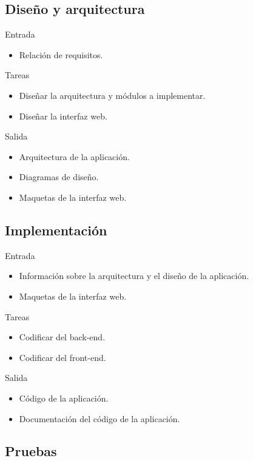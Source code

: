 \subsection*{Diseño y arquitectura\label{ssec:dp:disenho}}

Entrada
\begin{itemize}[leftmargin=3.5em]
  \item Relación de requisitos.
\end{itemize}

Tareas
\begin{itemize}[leftmargin=3.5em]
  \item Diseñar la arquitectura y módulos a implementar.
  \item Diseñar la interfaz web.
\end{itemize}

Salida
\begin{itemize}[leftmargin=3.5em]
  \item Arquitectura de la aplicación.
  \item Diagramas de diseño.
  \item Maquetas de la interfaz web.
\end{itemize}

\subsection*{Implementación\label{ssec:dp:implementacion}}

Entrada
\begin{itemize}[leftmargin=3.5em]
  \item Información sobre la arquitectura y el diseño de la aplicación.
  \item Maquetas de la interfaz web.
\end{itemize}

Tareas
\begin{itemize}[leftmargin=3.5em]
  \item Codificar del \gls{back-end}.
  \item Codificar del \gls{front-end}.
\end{itemize}

Salida
\begin{itemize}[leftmargin=3.5em]
  \item Código de la aplicación.
  \item Documentación del código de la aplicación.
\end{itemize}

\subsection*{Pruebas\label{ssec:dp:pruebas}}


